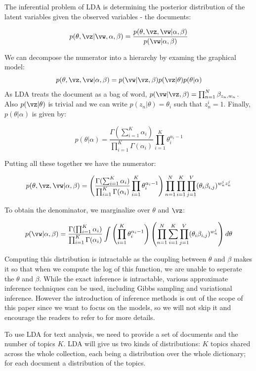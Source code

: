 The inferential problem of LDA is determining the posterior distribution of the latent variables given the observed variables - the documents:

$$p(\theta, \vz | \vw, \alpha, \beta) = \frac{p(\theta, \vz, \vw | \alpha, \beta)}{p(\vw | \alpha, \beta)}$$

We can decompose the numerator into a hierarchy by examing the graphical model:
$$p(\theta, \vz, \vw | \alpha, \beta) = p(\vw | \vz, \beta)p(\vz | \theta)p(\theta| \alpha)$$
As LDA treats the document as a bag of word, $p(\vw | \vz, \beta) = \prod_{n=1}^N \beta_{z_n, w_n}$. Also $p(\vz | \theta)$ is trivial and we can write $p(z_n | \theta)=\theta_i$ such that $z_n^i=1$. Finally, $p(\theta | \alpha)$ is given by:

$$p(\theta | \alpha) = \frac{\Gamma(\sum_{i=1}^K \alpha_i)}{\prod_{i=1}^K \Gamma(\alpha_i)} \prod_{i=1}^K \theta_i ^ {\alpha_i - 1}$$

Putting all these together we have the numerator:

$$p(\theta, \vz, \vw | \alpha, \beta) = \left(\frac{\Gamma(\sum_{i=1}^K \alpha_i)}{\prod_{i=1}^K \Gamma(\alpha_i)} \prod_{i=1}^K \theta_i ^ {\alpha_i - 1}\right) 
\prod_{n=1}^N \prod_{i=1}^K \prod_{j=1}^V (\theta_i \beta_{i,j})^{w_n^jz_n^j}$$

To obtain the denominator, we marginalize over $\theta$ and $\vz$:

$$p(\vw | \alpha, \beta) = \frac{\Gamma(\prod_{i=1}^K \alpha_i)}{\prod_{i=1}^K \Gamma(\alpha_i)} \int \left(\prod_{i=1}^K \theta_i^{\alpha_i - 1}\right)
\left(\prod_{n=1}^N \sum_{i=1}^K \prod_{j=1}^V (\theta_i\beta_{i,j})^{w_n^j}\right)
d\theta $$

Computing this distribution is intractable as the coupling between $\theta$ and $\beta$ makes it so that when we compute the log of this function, we are unable to seperate the $\theta$ and $\beta$. While the exact inference is intractable, various approximate inference techniques can be used, including Gibbs sampling and variational inference. However the introduction of inference methods is out of the scope of this paper since we want to focus on the models, so we will not skip it and encourage the readers to refer to \cite{steyvers2005probabilistic,blei2012probabilistic} for more details. 

To use LDA for text analysis, we need to provide a set of documents and the number of topics $K$. LDA will give us two kinds of distributions: $K$ topics shared across the whole collection, each being a distribution over the whole dictionary; for each document a distribution of the topics. 

